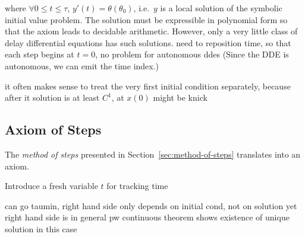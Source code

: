 \documentclass[10pt]{report}
\begin{document}
        \begin{calculus}
        \end{calculus}

        where $\forall 0\leq t\leq\tau$, $y'(t)=\theta(\theta_0)$, i.e.\ $y$ is a local solution of the symbolic initial value problem. The solution must be expressible in polynomial form so that the axiom leads to decidable arithmetic.
        However, only a very little class of delay differential equations has such solutions.
        need to reposition time, so that each step begins at $t=0$, no problem for autonomous ddes
        (Since the DDE is autonomous, we can emit the time index.)

it often makes sense to treat the very first initial condition separately, because after it solution is at least $C^1$, at $x(0)$ might be knick

    \subsection{Axiom of Steps}
        \label{sec:axiom-of-steps}

        The \emph{method of steps} presented in Section~\ref{sec:method-of-steps} translates into an axiom.

        Introduce a fresh variable $t$ for tracking time

        can go taumin, right hand side only depends on initial cond, not on solution yet
        right hand side is in general pw continuous
        theorem shows existence of unique solution in this case

        \begin{calculus}
        \end{calculus}
\end{document}
